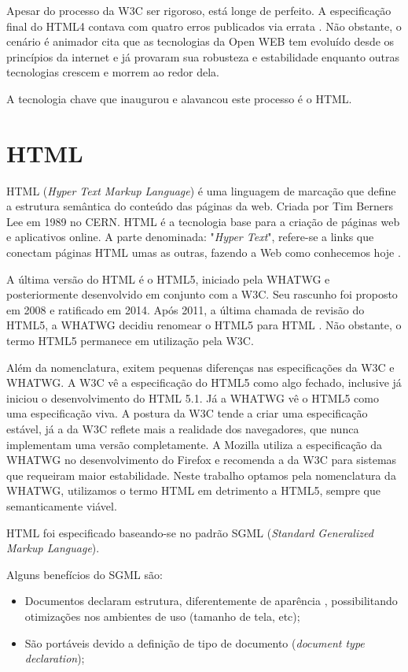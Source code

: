 Apesar do processo da W3C ser rigoroso, está longe de perfeito. A
especificação final do HTML4 contava com quatro erros publicados
via errata \autocite{HTML5}. Não obstante, o cenário é animador
\autocite{html5mostwanted} cita que as tecnologias da Open WEB tem
evoluído desde os princípios da internet e já provaram sua robusteza
e estabilidade enquanto outras tecnologias crescem e morrem ao redor
dela.

A tecnologia chave que inaugurou e alavancou este processo é o HTML.
\section{HTML}

HTML (\textit{Hyper Text Markup Language}) é uma linguagem de
marcação que define a estrutura semântica do conteúdo das páginas
da web. Criada por Tim Berners Lee em 1989 no CERN. HTML é a tecnologia
base para a criação de páginas web e aplicativos online. A parte
denominada: "\textit{Hyper Text}", refere-se a links que conectam
páginas HTML umas as outras, fazendo a Web como conhecemos hoje
\autocite{mdn2015}.

A última versão do HTML é o HTML5, iniciado pela WHATWG e
posteriormente desenvolvido em conjunto com a W3C. Seu rascunho foi
proposto em 2008 e ratificado em 2014. Após 2011, a última chamada
de revisão do HTML5, a WHATWG decidiu renomear o HTML5 para HTML
\autocite{htmlIsTheNewHtml5}. Não obstante, o termo HTML5 permanece em
utilização pela W3C.

Além da nomenclatura, exitem pequenas diferenças nas especificações
da W3C e WHATWG. A W3C vê a especificação do HTML5 como algo fechado,
inclusive já iniciou o desenvolvimento do HTML 5.1. Já a WHATWG vê o
HTML5 como uma especificação viva. A postura da W3C tende a criar uma
especificação estável, já a da W3C reflete mais a realidade dos
navegadores, que nunca implementam uma versão completamente. A Mozilla
utiliza a especificação da WHATWG no desenvolvimento do Firefox e
recomenda a da W3C para sistemas que requeiram maior estabilidade. Neste
trabalho optamos pela nomenclatura da WHATWG, utilizamos o termo HTML em
detrimento a HTML5, sempre que semanticamente viável.

HTML foi especificado baseando-se no padrão SGML (\textit{Standard Generalized
Markup Language}).

Alguns benefícios do SGML são:
\begin{itemize}
    \item Documentos declaram estrutura, diferentemente de aparência
, possibilitando otimizações nos ambientes de uso (tamanho de tela,
etc);
    \item São portáveis devido a definição de tipo de documento
(\textit{document type declaration});
\end{itemize}

